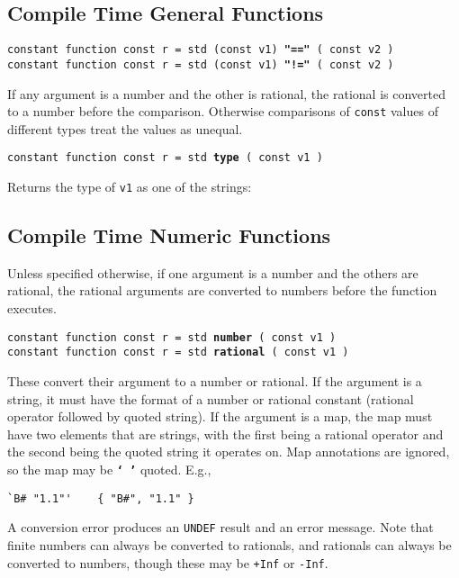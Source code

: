 \documentclass[12pt]{article}
\newcommand{\TT}[1]{{\tt \bfseries #1}}
\newcommand{\ttkey}[1]{{\tt \bfseries #1}}
\newenvironment{indpar}[1][0.3in]%
	{\begin{list}{}%
		     {\setlength{\itemsep}{0in}%
		      \setlength{\topsep}{0in}%
		      \setlength{\parsep}{1ex}%
		      \setlength{\labelwidth}{#1}%
		      \setlength{\leftmargin}{#1}%
		      \addtolength{\leftmargin}{\labelsep}}%
	 \item}%
	{\end{list}}
\begin{document}
\subsection{Compile Time General Functions}

{\tt constant function const r = std (const v1) \ttkey{"=="} ( const v2 )} \\
{\tt constant function const r = std (const v1) \ttkey{"!="} ( const v2 )}
\begin{indpar}
If any argument is a number and the other is rational,
the rational is converted to a number before the comparison.
Otherwise comparisons of {\tt const} values of different types treat
the values as unequal.
\end{indpar}

{\tt constant function const r = std \ttkey{type} ( const v1 )}
\begin{indpar}
Returns the type of {\tt v1} as one of the strings: \\
\hspace*{0.5in}{\tt
"special" ~  "number" ~ "rational" ~ "string" ~ \tt "map"}
\end{indpar}


\subsection{Compile Time Numeric Functions}

Unless specified otherwise,
if one argument is a number and the others are rational,
the rational arguments are converted to numbers before
the function executes.

{\tt constant function const r = std \ttkey{number} ( const v1 )} \\
{\tt constant function const r = std \ttkey{rational} ( const v1 )}
\begin{indpar}
These convert their argument to a number or rational.  If
the argument is a string, it must have the format of
a number or rational constant (rational operator followed
by quoted string).
If the argument is a map, the map must have two elements
that are strings, with the first being a rational operator
and the second being the quoted string it operates on.
Map annotations are ignored, so the map may be
\TT{`~'} quoted.  E.g.,
\begin{indpar}\begin{verbatim}
`B# "1.1"'    { "B#", "1.1" }
\end{verbatim}\end{indpar}


A conversion
error produces an {\tt UNDEF} result and an error message.
Note that finite numbers can always be converted to rationals,
and rationals can always be converted to numbers, though these
may be {\tt +Inf} or {\tt -Inf}.
\end{indpar}
\end{document}
